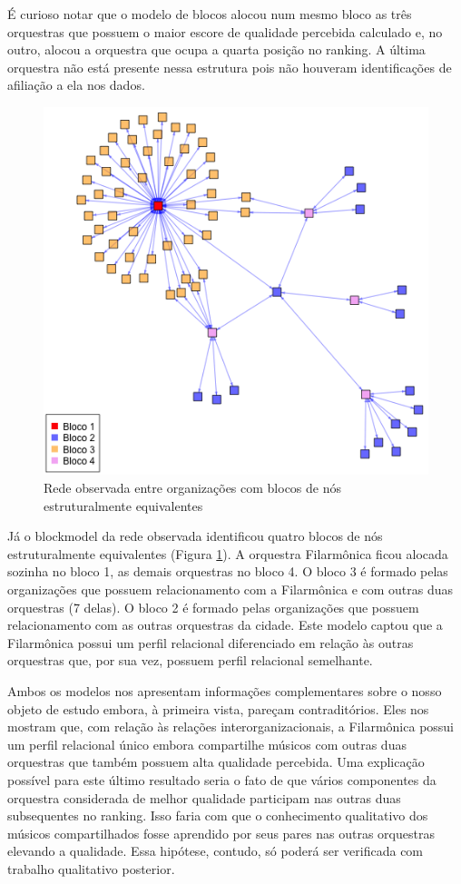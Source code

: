 \documentclass[a4paper, 12pt, openright, oneside, german, french, english, brazil]{abntex2}
\begin{document}
	
	É curioso notar que o modelo de blocos alocou num mesmo bloco as três orquestras que possuem o maior escore de qualidade percebida calculado e, no outro, alocou a orquestra que ocupa a quarta posição no ranking. A última orquestra não está presente nessa estrutura pois não houveram identificações de afiliação a ela nos dados.
	
	
	\begin{figure}[!ht]
		\centering
		\caption{Rede observada entre organizações com blocos de nós estruturalmente equivalentes}
		\label{blocos:orgs}
		\includegraphics[scale=.7]{block_nivel2_observado.png}
	\end{figure}

	Já o blockmodel da rede observada identificou quatro blocos de nós estruturalmente equivalentes (Figura \ref{blocos:orgs}). A orquestra Filarmônica ficou alocada sozinha no bloco 1, as demais orquestras no bloco 4. O bloco 3 é formado pelas organizações que possuem relacionamento com a Filarmônica e com outras duas orquestras (7 delas). O bloco 2 é formado pelas organizações que possuem relacionamento com as outras orquestras da cidade. Este modelo captou que a Filarmônica possui um perfil relacional diferenciado em relação às outras orquestras que, por sua vez, possuem perfil relacional semelhante.

        Ambos os modelos nos apresentam informações complementares sobre o nosso objeto de estudo embora, à primeira vista, pareçam contraditórios. Eles nos mostram que, com relação às relações interorganizacionais, a Filarmônica possui um perfil relacional único embora compartilhe músicos com outras duas orquestras que também possuem alta qualidade percebida. Uma explicação possível para este último resultado seria o fato de que vários componentes da orquestra considerada de melhor qualidade participam nas outras duas subsequentes no ranking. Isso faria com que o conhecimento qualitativo dos músicos compartilhados fosse aprendido por seus pares nas outras orquestras elevando a qualidade. Essa hipótese, contudo, só poderá ser verificada com trabalho qualitativo posterior.
\end{document}
